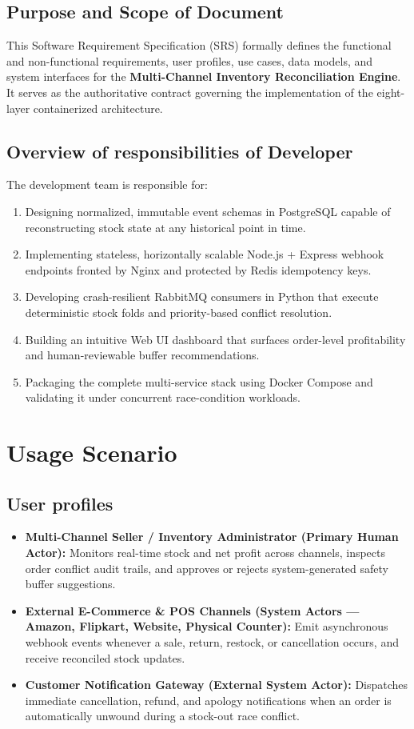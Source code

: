 \documentclass[oneside,a4paper,12pt]{report}
\begin{document}
\subsection{Purpose and Scope of Document}
This Software Requirement Specification (SRS) formally defines the functional and non-functional requirements, user profiles, use cases, data models, and system interfaces for the \textbf{Multi-Channel Inventory Reconciliation Engine}. It serves as the authoritative contract governing the implementation of the eight-layer containerized architecture.

\subsection{Overview of responsibilities of Developer}
The development team is responsible for:
\begin{enumerate}
  \item Designing normalized, immutable event schemas in PostgreSQL capable of reconstructing stock state at any historical point in time.
  \item Implementing stateless, horizontally scalable Node.js + Express webhook endpoints fronted by Nginx and protected by Redis idempotency keys.
  \item Developing crash-resilient RabbitMQ consumers in Python that execute deterministic stock folds and priority-based conflict resolution.
  \item Building an intuitive Web UI dashboard that surfaces order-level profitability and human-reviewable buffer recommendations.
  \item Packaging the complete multi-service stack using Docker Compose and validating it under concurrent race-condition workloads.
\end{enumerate}

\section{Usage Scenario}
\subsection{User profiles}
\begin{itemize}
  \item \textbf{Multi-Channel Seller / Inventory Administrator (Primary Human Actor):} Monitors real-time stock and net profit across channels, inspects order conflict audit trails, and approves or rejects system-generated safety buffer suggestions.
  \item \textbf{External E-Commerce \& POS Channels (System Actors — Amazon, Flipkart, Website, Physical Counter):} Emit asynchronous webhook events whenever a sale, return, restock, or cancellation occurs, and receive reconciled stock updates.
  \item \textbf{Customer Notification Gateway (External System Actor):} Dispatches immediate cancellation, refund, and apology notifications when an order is automatically unwound during a stock-out race conflict.
\end{itemize}
\end{document}

